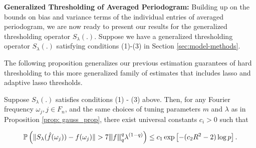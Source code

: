 \noindent \textbf{Generalized Thresholding of Averaged Periodogram:} Building up on the bounds on bias and variance terms of the individual entries of averaged periodogram, we are now ready to present our results for the generalized thresholding operator $S_\lambda(.)$. Suppose we have a generalized thresholding operator $S_\lambda(.)$ satisfying conditions (1)-(3) in Section \ref{sec:model-methods}.
\iffalse
for spectral density initially proposed by \citet{rothman2009generalized} for covariance matrix estimation which satisfies following three conditions, for each $1\le r,s\le p$, 
\begin{enumerate}[label=(\roman*)]
\item $|S_{\lambda}(\hat{f}_{rs}(\omega_j))|\le |\hat{f}_{rs}(\omega_j)| $;
\item $S_{\lambda}(\hat{f}_{rs}(\omega_j)) = 0$ if $|\hat{f}_{rs}(\omega_j)|\le \lambda$;
\item $|S_{\lambda}(\hat{f}_{rs}(\omega_j)) - \hat{f}_{rs}(\omega_j)|\le |\hat{f}_{rs}(\omega_j)|$.
\end{enumerate}
This family of generalized operator includes hard thresholding as well as {\color{red} [Yige: we called it 'soft threshold' earlier. I like Lasso better. Let's change all occurrences of 'soft threshold' to 'Lasso'.]} Lasso and adaptive Lasso based shrinkage operators.
\fi
The following proposition generalizes our previous estimation guarantees of hard thresholding to this more generalized family of estimates that includes lasso and adaptive lasso thresholds.
\begin{prop}
Suppose $S_{\lambda}(.)$ satisfies conditions (1) - (3) above. Then, for any Fourier frequency $\omega_j, j\in F_n$, and the same choices of tuning parameters $m$ and $\lambda$ as in Proposition \ref{prop: gauss_prop}, there exist universal constants $c_i > 0$ such that 


\begin{equation}
\mathbb{P} \left( \|S_{\lambda}(\hat{f}(\omega_j))-f(\omega_j)\| >  7{\left\vert\kern-0.25ex\left\vert\kern-0.25ex\left\vert f \right\vert\kern-0.25ex\right\vert\kern-0.25ex\right\vert}_q^q \lambda^{(1-q)}\right) \le c_1 \exp \left[ -(c_2R^2-2)\log p \right]. \nonumber
\end{equation}
\end{prop}


